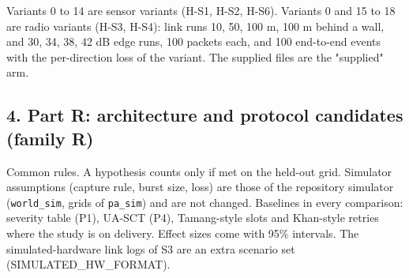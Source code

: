 Variants 0 to 14 are sensor variants (H-S1, H-S2, H-S6). Variants 0 and 15 to 18 are radio variants (H-S3, H-S4): link runs 10, 50, 100 m, 100 m behind a wall, and 30, 34, 38, 42 dB edge runs, 100 packets each, and 100 end-to-end events with the per-direction loss of the variant. The supplied files are the "supplied" arm.

\subsection*{4. Part R: architecture and protocol candidates (family R)}

Common rules. A hypothesis counts only if met on the held-out grid. Simulator assumptions (capture rule, burst size, loss) are those of the repository simulator (\texttt{world\_sim}, grids of \texttt{pa\_sim}) and are not changed. Baselines in every comparison: severity table (P1), UA-SCT (P4), Tamang-style slots and Khan-style retries where the study is on delivery. Effect sizes come with 95\% intervals. The simulated-hardware link logs of S3 are an extra scenario set (SIMULATED\_HW\_FORMAT).

